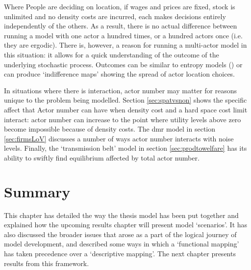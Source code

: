 {Where People are deciding on location, if wages and prices are fixed, stock is unlimited and no density costs are incurred, each makes decisions entirely independently of the others. As a result, there is no actual difference between running a model with one actor a hundred times, or a hundred actors once (i.e. they are ergodic). There is, however, a reason for running a multi-actor model in this situation: it allows for a quick understanding of the outcome of the underlying stochastic process. Outcomes can be similar to entropy models (\citealt{wilson_entropy_1970}) or can produce `indifference maps' showing the spread of actor location choices.

In situations where there is interaction, actor number may matter for reasons unique to the problem being modelled. Section \ref{sec:spatvsnon} shows the specific affect that Actor number can have when density cost and a hard space cost limit interact: actor number can increase to the point where utility levels above zero become impossible because of density costs. The \gls{dmr} model in section \ref{sec:firmsLoV} discusses a number of ways actor number interacts with noise levels. Finally, the `transmission belt' model in section \ref{sec:prodtowelfare} has its ability to swiftly find equilibrium affected by total actor number.

\section{Summary}

This chapter has detailed the way the thesis model has been put together and explained how the upcoming results chapter will present model `scenarios'. It has also discussed the broader issues that arose as a part of the logical journey of model development, and described some ways in which a `functional mapping' has taken precedence over a `descriptive mapping'. The next chapter presents results from this framework.


}
